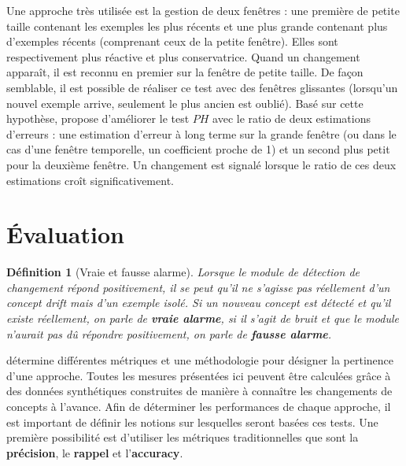 \documentclass[utf8]{stageM2R} %
\newtheorem{mydef}{Définition}
\theoremstyle{remark}
\renewcommand{\emph}{\textbf}
\begin{document}
Une approche très utilisée est la gestion de deux fenêtres : une première de petite taille contenant les exemples les plus récents et une plus grande contenant plus d'exemples récents (comprenant ceux de la petite fenêtre). Elles sont respectivement plus réactive et plus conservatrice. Quand un changement apparaît, il est reconnu en premier sur la fenêtre de petite taille. De façon semblable, il est possible de réaliser ce test avec des fenêtres glissantes (lorsqu'un nouvel exemple arrive, seulement le plus ancien est oublié). Basé sur cette hypothèse, \cite{Gama2013} propose d'améliorer le test $PH$\cite{Page1954} avec le ratio de deux estimations d'erreurs : une estimation d'erreur à long terme sur la grande fenêtre (ou dans le cas d'une fenêtre temporelle, un coefficient proche de 1) et un second plus petit pour la deuxième fenêtre. Un changement est signalé lorsque le ratio de ces deux estimations croît significativement.

\section{Évaluation}

\begin{mydef}[Vraie et fausse alarme]
Lorsque le module de détection de changement répond positivement, il se peut qu'il ne s'agisse pas réellement d'un concept drift mais  d'un exemple isolé. Si un nouveau concept est détecté et qu'il existe réellement, on parle de \emph{vraie alarme}, si il s'agit de bruit et que le module n'aurait pas dû répondre positivement, on parle de \emph{fausse alarme}.
\end{mydef}

\cite{Gama2013} détermine différentes métriques et une méthodologie pour désigner la pertinence d'une approche. Toutes les mesures présentées ici peuvent être calculées grâce à des données synthétiques construites de manière à connaître les changements de concepts à l'avance.
Afin de déterminer les performances de chaque approche, il est important de définir les notions sur lesquelles seront basées ces tests. Une première possibilité est d'utiliser les métriques traditionnelles que sont la \emph{précision}, le \emph{rappel} et l'\emph{accuracy}.
\end{document}
